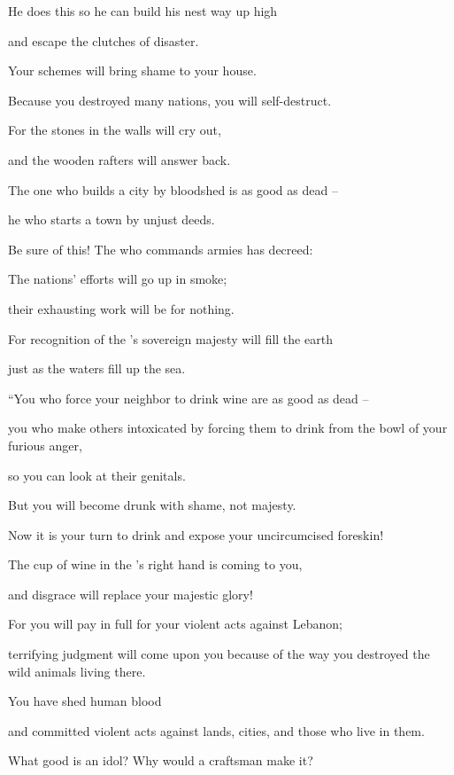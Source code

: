 {\par }{\Q He does
this so he can
build his nest
way up high
\par }{\Q and escape the clutches
of disaster.
\par }{\Q {}Your schemes
will bring shame
to your house.
\par }{\Q Because you destroyed many
nations,
you will self-destruct.
\par }{\Q {}For
the stones
in the walls
will cry
out,
\par }{\Q and the wooden
rafters
will answer back.
\par }{\Q {}The one who builds
a city
by bloodshed is as good as dead –
\par }{\Q he who starts a town by unjust deeds.
\par }{\Q {}Be sure
of this! The
{}
who commands armies
has decreed:
\par }{\Q The nations’
efforts
will go up in smoke;
\par }{\Q their
exhausting
work will be for nothing.
\par }{\Q {}For
recognition
of the
{}’s
sovereign majesty
will fill
the earth
\par }{\Q just as the waters
fill up
the sea.
\par }{\Q {}“You who force your neighbor
to drink wine are as good as dead –
\par }{\Q you who make others intoxicated by forcing them to drink from the bowl of your furious anger,
\par }{\Q so you can look at their genitals.
\par }{\Q {}But you will become drunk
with shame,
not majesty.
\par }{\Q Now
it is your
turn
to drink
and expose
your uncircumcised foreskin!

\par }{\Q The cup
of wine in the
{}’s
right hand
is coming to you,
\par }{\Q and disgrace
will replace your majestic glory!
\par }{\Q {}For
you will pay in full for your violent
acts against Lebanon;
\par }{\Q terrifying judgment will come upon
you because of the way you destroyed
the wild animals
living there.

\par }{\Q You have shed
human
blood
\par }{\Q and committed violent
acts against lands,
cities,
and those who live in them.
\par }{\Q {}What
good
is an idol? Why would
a craftsman
make
it?

}
